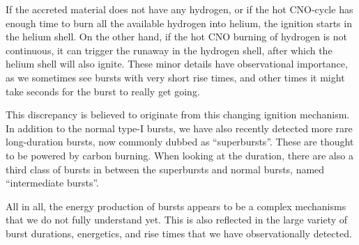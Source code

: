If the accreted material does not have any hydrogen, or if the hot CNO-cycle has enough time to burn all the available hydrogen into helium, the ignition starts in the helium shell.
On the other hand, if the hot CNO burning of hydrogen is not continuous, it can trigger the runaway in the hydrogen shell, after which the helium shell will also ignite.
These minor details have observational importance, as we sometimes see bursts with very short rise times, and other times it might take seconds for the burst to really get going.%

This discrepancy is believed to originate from this changing ignition mechanism.
In addition to the normal type-I bursts, we have also recently detected more rare long-duration bursts, now commonly dubbed as ``superbursts''.\cite{CHK00, Kuulkers02, SB02}
These are thought to be powered by carbon burning.\cite{Cumming01}
When looking at the duration, there are also a third class of bursts in between the superbursts and normal bursts, named ``intermediate bursts''.\cite{Cumming06}

All in all, the energy production of bursts appears to be a complex mechanisms that we do not fully understand yet.
This is also reflected in the large variety of burst durations, energetics, and rise times that we have observationally detected.\cite[see e.g.,][]{GMH08}
